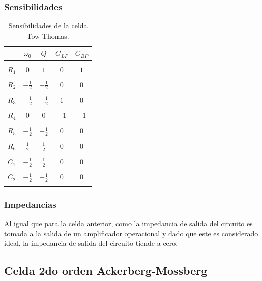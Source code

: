 \subsubsection{Sensibilidades}
\begin{table}[H]
	\centering
	\begin{tabular}{c c c c c }
		& $\omega_0$ & $Q$ &$G_{LP}$ & $G_{BP}$\\
		\hline \\
		$R_1$ & $0$& $1$ & $0$& $1$\\ \\
		$R_2$ & $-\frac{1}{2}$& $-\frac{1}{2}$ & $0$& $0$\\ \\
		$R_3$ & $-\frac{1}{2}$& $-\frac{1}{2}$ & $1$&$0$ \\ \\
		$R_4$ & $0$& $0$& $-1$ &$-1$ \\ \\
		$R_5$ & $-\frac{1}{2}$&$-\frac{1}{2}$ & $0$&$0$ \\ \\
		$R_6$ & $\frac{1}{2}$& $\frac{1}{2}$ & $0$& $0$ \\ \\
		$C_1$ & $-\frac{1}{2}$& $\frac{1}{2}$ & $0$& $0$\\ \\
		$C_2$ & $-\frac{1}{2}$& $-\frac{1}{2}$ & $0$ & $0$\\ \\
		\hline
	\end{tabular}
	\caption{Sensibilidades de la celda Tow-Thomas.}
	\label{sens_tt}
\end{table}


\subsubsection{Impedancias}
Al igual que para la celda anterior, como la impedancia de salida del circuito es tomada a la salida de un amplificador operacional y dado que este es considerado ideal, la impedancia de salida del circuito tiende a cero.

\subsection{Celda 2do orden Ackerberg-Mossberg}

